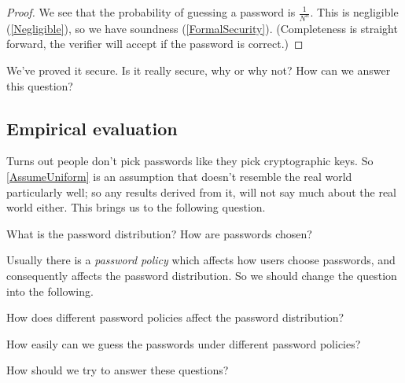 \begin{frame}
  \begin{proof}
    We see that the probability of guessing a password is \(\frac{1}{N^n}\).
    This is negligible (\cref{Negligible}), so we have soundness 
    (\cref{FormalSecurity}).
    (Completeness is straight forward, the verifier will accept if the password 
    is correct.)
  \end{proof}
\end{frame}

\begin{frame}
  \begin{exercise}
    We've proved it secure.
    Is it really secure, why or why not?
    How can we answer this question?
  \end{exercise}

\end{frame}

\subsection{Empirical evaluation}

Turns out people don't pick passwords like they pick cryptographic keys.
So \cref{AssumeUniform} is an assumption that doesn't resemble the real world 
particularly well; so any results derived from it, will not say much about the 
real world either.
This brings us to the following question.

\begin{frame}
\begin{question}\label{PasswordDistribution}
  What is the password distribution?
  How are passwords chosen?
\end{question}
\end{frame}

Usually there is a \emph{password policy} which affects how users choose 
passwords, and consequently affects the password distribution.
So we should change the question into the following.

\begin{frame}
\begin{question}
  How does different password policies affect the password distribution?
\end{question}
\begin{question}\label{Guessability}
  How easily can we guess the passwords under different password policies?
\end{question}
\begin{exercise}
  How should we try to answer these questions?
\end{exercise}
\end{frame}

